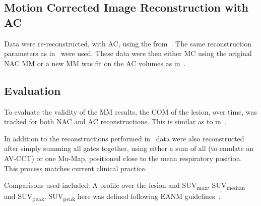             \subsection{Motion Corrected Image Reconstruction with AC} \label{sec:pet_ct_respiratory_motion_correction_with_a_single_attenuation_map_using_nac_derived_deformation_fields_methods_attenuation_corrected_image_reconstruction}
                Data were re-reconstructed, with \gls{AC}, using the  from~. The same reconstruction parameters as in~ were used. These data were then either \gls{MC} using the original \gls{NAC} \gls{MM} or a new \gls{MM} was fit on the \gls{AC} volumes as in~.
            
            \subsection{Evaluation} \label{sec:pet_ct_respiratory_motion_correction_with_a_single_attenuation_map_using_nac_derived_deformation_fields_methods_evaluation}
                To evaluate the validity of the \gls{MM} results, the \gls{COM} of the lesion, over time, was tracked for both \gls{NAC} and \gls{AC} reconstructions. This is similar as to in~.
                
                In addition to the reconstructions performed in~ data were also reconstructed after simply summing all gates together, using either a sum of all  (to emulate an \gls{AV-CCT}) or one \gls{Mu-Map}, positioned close to the mean respiratory position. This process matches current clinical practice. 
                
                Comparisons used included: A profile over the lesion and \gls{SUV}\textsubscript{max}, \gls{SUV}\textsubscript{median} and \gls{SUV}\textsubscript{peak}. \gls{SUV}\textsubscript{peak} here was defined following \gls{EANM} guidelines~.
            
